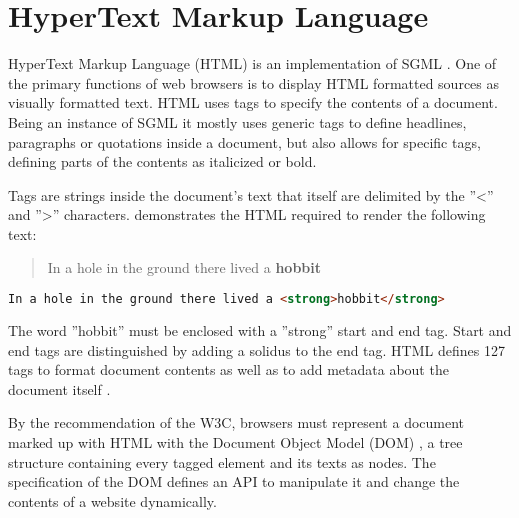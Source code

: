 






\section{HyperText Markup Language}


HyperText Markup Language (HTML) is an implementation of SGML \cite[SGML and HTML]{HTML401}. One of the primary functions of web browsers is to display HTML formatted sources as visually formatted text. HTML uses tags to specify the contents of a document. Being an instance of SGML it mostly uses generic tags to define headlines, paragraphs or quotations inside a document, but also allows for specific tags, defining parts of the contents as italicized or bold.

Tags are strings inside the document's text that itself are delimited by the ''<'' and ''>'' characters.  demonstrates the HTML required to render the following text:

\begin{quotation}
In a hole in the ground there lived a \textbf{hobbit}
\end{quotation}

\begin{lstlisting}[language=html, caption=Text formatted as bold with the ''strong'' tag, label=lst:html_markup_bold_example]
In a hole in the ground there lived a <strong>hobbit</strong>
\end{lstlisting}

The word ''hobbit'' must be enclosed with a ''strong'' start and end tag. Start and end tags are distinguished by adding a solidus to the end tag. HTML defines 127 tags to format document contents as well as to add metadata about the document itself \cite{mozel}.

By the recommendation of the W3C, browsers must represent a document marked up with HTML with the Document Object Model (DOM) \cite{DOM1}, a tree structure containing every tagged element and its texts as nodes. The specification of the DOM defines an API to manipulate it and change the contents of a website dynamically.

